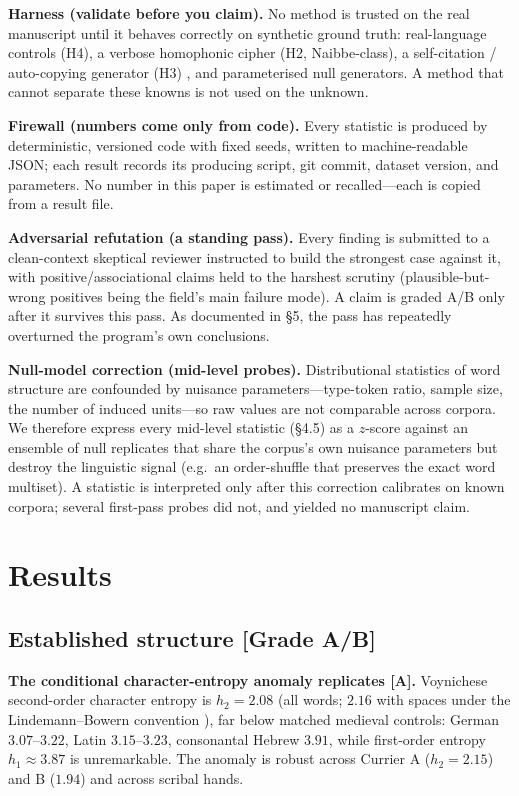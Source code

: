\documentclass[11pt]{article}
\newcommand{\grade}[1]{{\small\textbf{[#1]}}}
\begin{document}
\textbf{Harness (validate before you claim).} No method is trusted on the real
manuscript until it behaves correctly on synthetic ground truth: real-language
controls (H4), a verbose homophonic cipher (H2, Naibbe-class), a self-citation /
auto-copying generator (H3) \citep{timm2020selfcitation}, and parameterised null
generators. A method that cannot separate these knowns is not used on the unknown.

\textbf{Firewall (numbers come only from code).} Every statistic is produced by
deterministic, versioned code with fixed seeds, written to machine-readable JSON;
each result records its producing script, git commit, dataset version, and
parameters. No number in this paper is estimated or recalled---each is copied from a
result file.

\textbf{Adversarial refutation (a standing pass).} Every finding is submitted to a
clean-context skeptical reviewer instructed to build the strongest case against it,
with positive/associational claims held to the harshest scrutiny (plausible-but-wrong
positives being the field's main failure mode). A claim is graded A/B only after it
survives this pass. As documented in \S5, the pass has repeatedly overturned the
program's own conclusions.

\textbf{Null-model correction (mid-level probes).} Distributional statistics of word
structure are confounded by nuisance parameters---type-token ratio, sample size, the
number of induced units---so raw values are not comparable across corpora. We therefore
express every mid-level statistic (\S4.5) as a $z$-score against an ensemble of null
replicates that share the corpus's own nuisance parameters but destroy the linguistic
signal (e.g.\ an order-shuffle that preserves the exact word multiset). A statistic is
interpreted only after this correction calibrates on known corpora; several first-pass
probes did not, and yielded no manuscript claim.

\section{Results}

\subsection{Established structure \grade{Grade A/B}}
\textbf{The conditional character-entropy anomaly replicates \grade{A}.} Voynichese
second-order character entropy is $h_2 = 2.08$ (all words; $2.16$ with spaces under
the Lindemann--Bowern convention \citep{lindemann2022entropy}), far below matched
medieval controls: German $3.07$--$3.22$, Latin $3.15$--$3.23$, consonantal Hebrew
$3.91$, while first-order entropy $h_1\approx 3.87$ is unremarkable. The anomaly is
robust across Currier A ($h_2=2.15$) and B ($1.94$) and across scribal hands.
\end{document}
